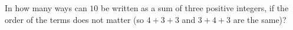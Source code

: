 In how many ways can $10$ be written as a sum of three positive integers, if the order of the terms does not matter (so $4+3+3$ and $3+4+3$ are the same)?

